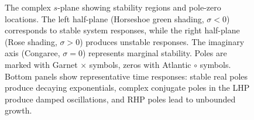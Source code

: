 \begin{figure}[htbp]
\caption{The complex $s$-plane showing stability regions and pole-zero locations. The left half-plane (Horseshoe green shading, $\sigma < 0$) corresponds to stable system responses, while the right half-plane (Rose shading, $\sigma > 0$) produces unstable responses. The imaginary axis (Congaree, $\sigma = 0$) represents marginal stability. Poles are marked with Garnet $\times$ symbols, zeros with Atlantic $\circ$ symbols. Bottom panels show representative time responses: stable real poles produce decaying exponentials, complex conjugate poles in the LHP produce damped oscillations, and RHP poles lead to unbounded growth.}
\label{fig:s_plane_visualization}
\end{figure}
